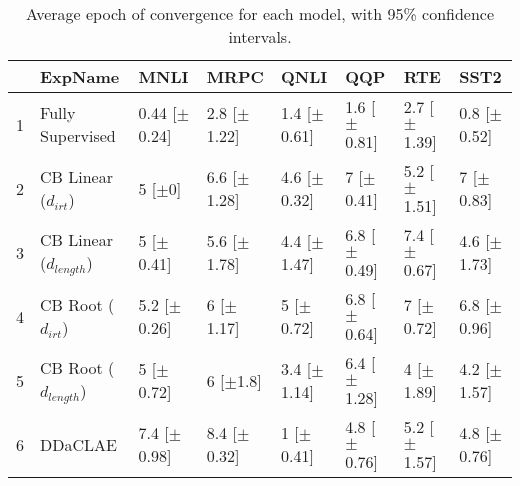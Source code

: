 \begin{table*}[ht]
\centering
\begingroup\small
\begin{tabular}{rlllllll}
  \hline
 & ExpName & MNLI & MRPC & QNLI & QQP & RTE & SST2 \\ 
  \hline
1 & Fully Supervised & 0.44 [$\pm$0.24] & 2.8 [$\pm$1.22] & 1.4 [$\pm$0.61] & 1.6 [$\pm$0.81] & 2.7 [$\pm$1.39] & 0.8 [$\pm$0.52] \\ 
  2 & CB Linear ($d_{irt}$) & 5 [$\pm$0] & 6.6 [$\pm$1.28] & 4.6 [$\pm$0.32] & 7 [$\pm$0.41] & 5.2 [$\pm$1.51] & 7 [$\pm$0.83] \\ 
  3 & CB Linear ($d_{length}$) & 5 [$\pm$0.41] & 5.6 [$\pm$1.78] & 4.4 [$\pm$1.47] & 6.8 [$\pm$0.49] & 7.4 [$\pm$0.67] & 4.6 [$\pm$1.73] \\ 
  4 & CB Root ($d_{irt}$) & 5.2 [$\pm$0.26] & 6 [$\pm$1.17] & 5 [$\pm$0.72] & 6.8 [$\pm$0.64] & 7 [$\pm$0.72] & 6.8 [$\pm$0.96] \\ 
  5 & CB Root ($d_{length}$) & 5 [$\pm$0.72] & 6 [$\pm$1.8] & 3.4 [$\pm$1.14] & 6.4 [$\pm$1.28] & 4 [$\pm$1.89] & 4.2 [$\pm$1.57] \\ 
  6 & DDaCLAE & 7.4 [$\pm$0.98] & 8.4 [$\pm$0.32] & 1 [$\pm$0.41] & 4.8 [$\pm$0.76] & 5.2 [$\pm$1.57] & 4.8 [$\pm$0.76] \\ 
   \hline
\end{tabular}
\endgroup
\caption{Average epoch of convergence for each model, with 95\% confidence intervals.} 
\label{tab:epoch_bert-True}
\end{table*}
